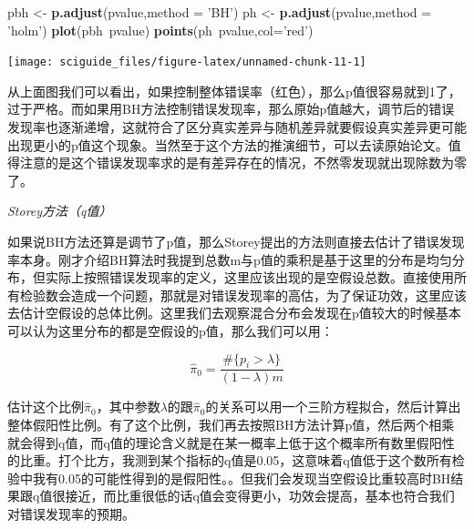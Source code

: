 \documentclass[]{tufte-book}
\newenvironment{Shaded}{}{}
\newcommand{\CommentTok}[1]{\textcolor[rgb]{0.38,0.63,0.69}{\textit{#1}}}
\newcommand{\DataTypeTok}[1]{\textcolor[rgb]{0.56,0.13,0.00}{#1}}
\newcommand{\KeywordTok}[1]{\textcolor[rgb]{0.00,0.44,0.13}{\textbf{#1}}}
\newcommand{\NormalTok}[1]{#1}
\newcommand{\OperatorTok}[1]{\textcolor[rgb]{0.40,0.40,0.40}{#1}}
\newcommand{\StringTok}[1]{\textcolor[rgb]{0.25,0.44,0.63}{#1}}
\begin{document}
\begin{Shaded}
\begin{Highlighting}[]
\NormalTok{pbh <-}\StringTok{ }\KeywordTok{p.adjust}\NormalTok{(pvalue,}\DataTypeTok{method =} \StringTok{'BH'}\NormalTok{)}
\NormalTok{ph <-}\StringTok{ }\KeywordTok{p.adjust}\NormalTok{(pvalue,}\DataTypeTok{method =} \StringTok{'holm'}\NormalTok{)}
\KeywordTok{plot}\NormalTok{(pbh}\OperatorTok{~}\NormalTok{pvalue)}
\KeywordTok{points}\NormalTok{(ph}\OperatorTok{~}\NormalTok{pvalue,}\DataTypeTok{col=}\StringTok{'red'}\NormalTok{)}
\end{Highlighting}
\end{Shaded}

\texttt{[image: sciguide\_files/figure-latex/unnamed-chunk-11-1]}

从上面图我们可以看出，如果控制整体错误率（红色），那么p值很容易就到1了，过于严格。而如果用BH方法控制错误发现率，那么原始p值越大，调节后的错误发现率也逐渐递增，这就符合了区分真实差异与随机差异就要假设真实差异更可能出现更小的p值这个现象。当然至于这个方法的推演细节，可以去读原始论文。值得注意的是这个错误发现率求的是有差异存在的情况，不然零发现就出现除数为零了。

\emph{Storey方法（q值）}

如果说BH方法还算是调节了p值，那么Storey提出的方法则直接去估计了错误发现率本身。刚才介绍BH算法时我提到总数m与p值的乘积是基于这里的分布是均匀分布，但实际上按照错误发现率的定义，这里应该出现的是空假设总数。直接使用所有检验数会造成一个问题，那就是对错误发现率的高估，为了保证功效，这里应该去估计空假设的总体比例。这里我们去观察混合分布会发现在p值较大的时候基本可以认为这里分布的都是空假设的p值，那么我们可以用：

\[
\hat\pi_0 = \frac{\#\{p_i>\lambda\}}{(1-\lambda)m}
\]

估计这个比例\(\hat\pi_0\)，其中参数\(\lambda\)的跟\(\hat\pi_0\)的关系可以用一个三阶方程拟合，然后计算出整体假阳性比例。有了这个比例，我们再去按照BH方法计算p值，然后两个相乘就会得到q值，而q值的理论含义就是在某一概率上低于这个概率所有数里假阳性的比重。打个比方，我测到某个指标的q值是0.05，这意味着q值低于这个数所有检验中我有0.05的可能性得到的是假阳性。。但我们会发现当空假设比重较高时BH结果跟q值很接近，而比重很低的话q值会变得更小，功效会提高，基本也符合我们对错误发现率的预期。

\begin{Shaded}
\end{Shaded}
\end{document}

